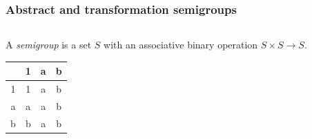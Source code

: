 \documentclass{beamer}
\newcommand{\gap}{\vskip10pt}
\begin{document}
\begin{frame}
\frametitle{Abstract and  transformation semigroups}

\begin{columns}
\begin{column}{.5\textwidth}
\begin{definition}
A \emph{semigroup} is a set $S$ with an associative binary operation $S\times S\rightarrow S$.
\end{definition}

\begin{example}
\begin{tabular}{c|ccc}
 &1&a&b\\
\hline
1&1&a&b\\
a&a&a&b\\
b&b&a&b
\end{tabular}
\end{example}
\gap


\end{column}
\end{columns}
\end{frame}
\end{document}
